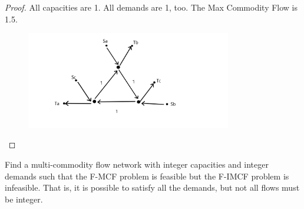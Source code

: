 \documentclass[12pt,a4]{article}
\begin{document}
\begin{proof}
	All capacities are 1. All demands are 1, too. The Max Commodity Flow is 1.5.
\begin{figure}[htbp]
  \begin{center}
  \includegraphics[width=0.8\textwidth]{figures/E11.png}

  \end{center}
\end{figure}
\end{proof}

\begin{exercise}
    Find a multi-commodity flow network with integer capacities and integer demands such that 
    the F-MCF problem is feasible but the F-IMCF problem is infeasible. That is, it is possible
    to satisfy all the demands, but not all flows must be integer.
\end{exercise}
\end{document}
